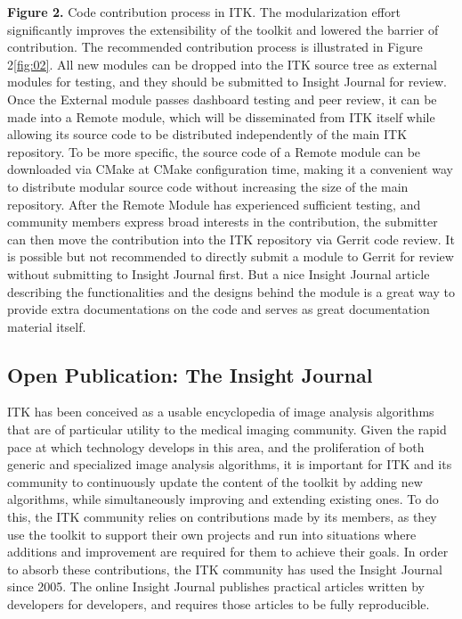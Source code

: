 \documentclass{frontiersENG} %
\begin{document}
\textbf{Figure 2.}{ Code contribution process in ITK.}\label{fig:02} The
modularization effort significantly improves the extensibility of the toolkit
and lowered the barrier of contribution. The recommended contribution process
is illustrated in Figure 2\ref{fig:02}.  All new modules can be dropped into
the ITK source tree as external modules for testing, and they should be
submitted to Insight Journal for review. Once the External module passes
dashboard testing and peer review,  it can be made into a Remote module, which
will be disseminated  from ITK itself while allowing its source code to be
distributed independently of the main ITK repository. To be more specific, the
source code of a Remote module can be downloaded via CMake at CMake
configuration time, making it a convenient way to distribute modular source
code without increasing the size of the main repository. After the Remote
Module has experienced sufficient testing, and community members express broad
interests in the contribution, the submitter can then move the contribution
into the ITK repository via Gerrit code review.  It is possible but not
recommended to directly submit a module to Gerrit for review without submitting
to Insight Journal first. But a nice Insight Journal article describing the functionalities
and the designs behind the module  is a great way to provide extra
documentations on the code and serves as great documentation material itself.


\subsection{Open Publication: The Insight Journal}
ITK has been conceived as a usable encyclopedia of image analysis algorithms
that are of particular utility to the medical imaging community. Given the
rapid pace at which technology develops in this area, and the proliferation of
both generic and specialized image analysis algorithms, it is important for ITK
and its community to continuously update the content of the toolkit by adding
new algorithms, while simultaneously improving and extending existing ones. To
do this, the ITK community relies on contributions made by its members, as they
use the toolkit to support their own projects and run into situations where
additions and improvement are required for them to achieve their goals. In
order to absorb these contributions, the ITK community has used the Insight
Journal \cite{InsightJournal} since 2005. The online Insight Journal
publishes practical articles written by developers for developers, and requires
those articles to be fully reproducible.
\end{document}
